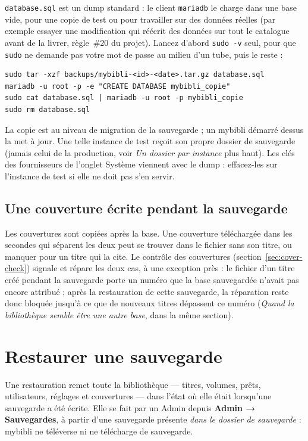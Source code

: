 \texttt{database.sql} est un dump standard : le client \texttt{mariadb}
le charge dans une base vide, pour une copie de test ou pour travailler
sur des données réelles (par exemple essayer une modification qui
réécrit des données sur tout le catalogue avant de la livrer, règle~\#20
du projet). Lancez d'abord \texttt{sudo -v} seul, pour que
\texttt{sudo} ne demande pas votre mot de passe au milieu d'un tube, puis
le reste :
\begin{lstlisting}
sudo tar -xzf backups/mybibli-<id>-<date>.tar.gz database.sql
mariadb -u root -p -e "CREATE DATABASE mybibli_copie"
sudo cat database.sql | mariadb -u root -p mybibli_copie
sudo rm database.sql
\end{lstlisting}
La copie est au niveau de migration de la sauvegarde ; un mybibli
démarré dessus la met à jour. Une telle instance de test reçoit son
propre dossier de sauvegarde (jamais celui de la production, voir
\emph{Un dossier par instance} plus haut). Les clés des fournisseurs de
l'onglet Système viennent avec le dump : effacez-les sur l'instance de
test si elle ne doit pas s'en servir.

\subsection*{Une couverture écrite pendant la sauvegarde}

Les couvertures sont copiées après la base. Une couverture téléchargée
dans les secondes qui séparent les deux peut se trouver dans le fichier
sans son titre, ou manquer pour un titre qui la cite. Le contrôle des
couvertures (section~\ref{sec:cover-check}) signale et répare les deux
cas, à une exception près : le fichier d'un titre créé pendant la
sauvegarde porte un numéro que la base sauvegardée n'avait pas encore
attribué ; après la restauration de cette sauvegarde, la réparation
reste donc bloquée jusqu'à ce que de nouveaux titres dépassent ce
numéro (\emph{Quand la bibliothèque semble être une autre base}, dans la
même section).

\section{Restaurer une sauvegarde}
\label{sec:backups-restore}

Une restauration remet toute la bibliothèque --- titres, volumes, prêts,
utilisateurs, réglages et couvertures --- dans l'état où elle était
lorsqu'une sauvegarde a été écrite. Elle se fait par un Admin depuis
\textbf{Admin → Sauvegardes}, à partir d'une sauvegarde présente
\emph{dans le dossier de sauvegarde} : mybibli ne téléverse ni ne
télécharge de sauvegarde.

